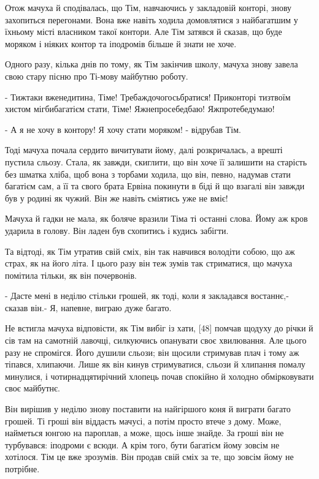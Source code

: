 Отож мачуха й сподівалась, що Тім, навчаючись у закладовій конторі, знову захопиться перегонами. Вона вже навіть ходила домовлятися з найбагатшим у їхньому місті власником такої контори. Але Тім затявся й сказав, що буде моряком і ніяких контор та іподромів більше й знати не хоче.

Одного разу, кілька днів по тому, як Тім закінчив школу, мачуха знову завела свою стару пісню про Ті-мову майбутню роботу.

- Тижтаки вженедитина, Тіме! Требаждочогосьбратися! Приконторі тизтвоїм хистом мігбибагатієм стати, Тіме! Яжнепросебедбаю! Яжпротебедумаю!

- А я не хочу в контору! Я хочу стати моряком! - відрубав Тім.

Тоді мачуха почала сердито вичитувати йому, далі розкричалась, а врешті пустила сльозу. Стала, як завжди, скиглити, що він хоче її залишити на старість без шматка хліба, щоб вона з торбами ходила, що він, певно, надумав стати багатієм сам, а її та свого брата Ервіна покинути в біді й що взагалі він завжди був у родині як чужий. Він же навіть сміятись уже не вміє!

Мачуха й гадки не мала, як боляче вразили Тіма ті останні слова. Йому аж кров ударила в голову. Він ладен був схопитись і кудись забігти.

Та відтоді, як Тім утратив свій сміх, він так навчився володіти собою, що аж страх, як на його літа. І цього разу він теж зумів так стриматися, що мачуха помітила тільки, як він почервонів.

- Дасте мені в неділю стільки грошей, як тоді, коли я закладався востаннє,- сказав він.- Я, напевне, виграю дуже багато.

Не встигла мачуха відповісти, як Тім вибіг із хати, [48] помчав щодуху до річки й сів там на самотній лавочці, силкуючись опанувати своє хвилювання. Але цього разу не спромігся. Його душили сльози; він щосили стримував плач і тому аж тіпався, хлипаючи. Лише як він кинув стримуватися, сльози й хлипання помалу минулися, і чотирнадцятирічний хлопець почав спокійно й холодно обмірковувати своє майбутнє.

Він вирішив у неділю знову поставити на найгіршого коня й виграти багато грошей. Ті гроші він віддасть мачусі, а потім просто втече з дому. Може, найметься юнгою на пароплав, а може, щось інше знайде. За гроші він не турбувався: іподроми є всюди. А крім того, бути багатієм йому зовсім не хотілося. Тім це вже зрозумів. Він продав свій сміх за те, що зовсім йому не потрібне.

